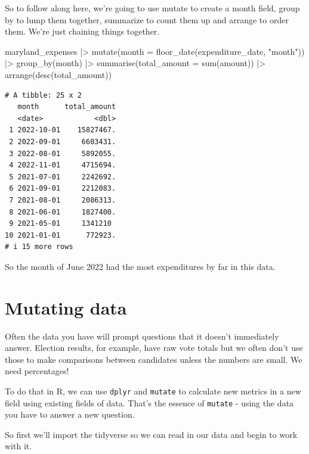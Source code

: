 \documentclass[
  letterpaper,
  DIV=11,
  numbers=noendperiod]{scrreprt}
\newenvironment{Shaded}{\begin{snugshade}}{\end{snugshade}}
\newcommand{\AttributeTok}[1]{\textcolor[rgb]{0.40,0.45,0.13}{#1}}
\newcommand{\FunctionTok}[1]{\textcolor[rgb]{0.28,0.35,0.67}{#1}}
\newcommand{\NormalTok}[1]{\textcolor[rgb]{0.00,0.23,0.31}{#1}}
\newcommand{\SpecialCharTok}[1]{\textcolor[rgb]{0.37,0.37,0.37}{#1}}
\newcommand{\StringTok}[1]{\textcolor[rgb]{0.13,0.47,0.30}{#1}}
\begin{document}
So to follow along here, we're going to use mutate to create a month
field, group by to lump them together, summarize to count them up and
arrange to order them. We're just chaining things together.

\begin{Shaded}
\begin{Highlighting}[]
\NormalTok{maryland\_expenses }\SpecialCharTok{|\textgreater{}}
  \FunctionTok{mutate}\NormalTok{(}\AttributeTok{month =} \FunctionTok{floor\_date}\NormalTok{(expenditure\_date, }\StringTok{"month"}\NormalTok{)) }\SpecialCharTok{|\textgreater{}}
  \FunctionTok{group\_by}\NormalTok{(month) }\SpecialCharTok{|\textgreater{}}
  \FunctionTok{summarise}\NormalTok{(}\AttributeTok{total\_amount =} \FunctionTok{sum}\NormalTok{(amount)) }\SpecialCharTok{|\textgreater{}}
  \FunctionTok{arrange}\NormalTok{(}\FunctionTok{desc}\NormalTok{(total\_amount))}
\end{Highlighting}
\end{Shaded}

\begin{verbatim}
# A tibble: 25 x 2
   month      total_amount
   <date>            <dbl>
 1 2022-10-01    15827467.
 2 2022-09-01     6603431.
 3 2022-08-01     5892055.
 4 2022-11-01     4715694.
 5 2021-07-01     2242692.
 6 2021-09-01     2212083.
 7 2021-08-01     2086313.
 8 2021-06-01     1827400.
 9 2021-05-01     1341210 
10 2021-01-01      772923.
# i 15 more rows
\end{verbatim}

So the month of June 2022 had the most expenditures by far in this data.


\hypertarget{mutating-data}{%
\chapter{Mutating data}\label{mutating-data}}

Often the data you have will prompt questions that it doesn't
immediately answer. Election results, for example, have raw vote totals
but we often don't use those to make comparisons between candidates
unless the numbers are small. We need percentages!

To do that in R, we can use \texttt{dplyr} and \texttt{mutate} to
calculate new metrics in a new field using existing fields of data.
That's the essence of \texttt{mutate} - using the data you have to
answer a new question.

So first we'll import the tidyverse so we can read in our data and begin
to work with it.
\end{document}
